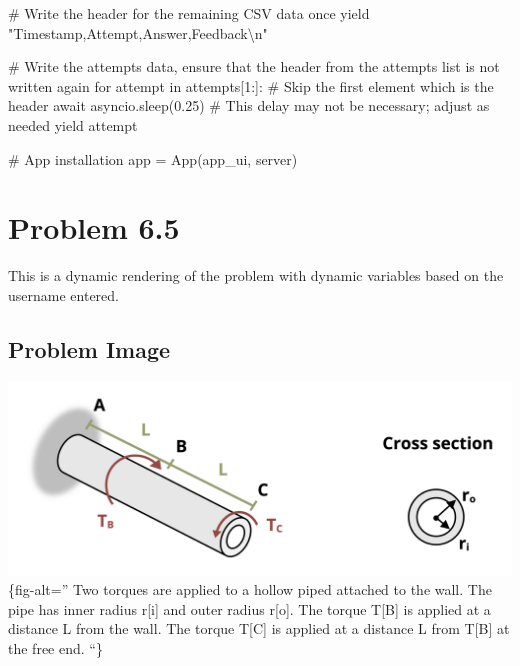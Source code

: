 \documentclass[
  letterpaper,
  DIV=11,
  numbers=noendperiod]{scrreprt}
\newenvironment{Shaded}{\begin{snugshade}}{\end{snugshade}}
\newcommand{\NormalTok}[1]{\textcolor[rgb]{0.00,0.23,0.31}{#1}}
\begin{document}
\begin{Shaded}
\begin{Highlighting}[]
\NormalTok{        \# Write the header for the remaining CSV data once}
\NormalTok{        yield "Timestamp,Attempt,Answer,Feedback\textbackslash{}n"}
        
\NormalTok{        \# Write the attempts data, ensure that the header from the attempts list is not written again}
\NormalTok{        for attempt in attempts[1:]:  \# Skip the first element which is the header}
\NormalTok{            await asyncio.sleep(0.25)  \# This delay may not be necessary; adjust as needed}
\NormalTok{            yield attempt}


\NormalTok{\# App installation}
\NormalTok{app = App(app\_ui, server)}
\end{Highlighting}
\end{Shaded}

\chapter*{Problem 6.5}\label{problem-6.5}


This is a dynamic rendering of the problem with dynamic variables based
on the username entered.

\section*{Problem Image}\label{problem-image-48}


\includegraphics{images/278.png}\{fig-alt='' Two torques are applied to
a hollow piped attached to the wall. The pipe has inner radius r{[}i{]}
and outer radius r{[}o{]}. The torque T{[}B{]} is applied at a distance
L from the wall. The torque T{[}C{]} is applied at a distance L from
T{[}B{]} at the free end. ``\}
\end{document}
